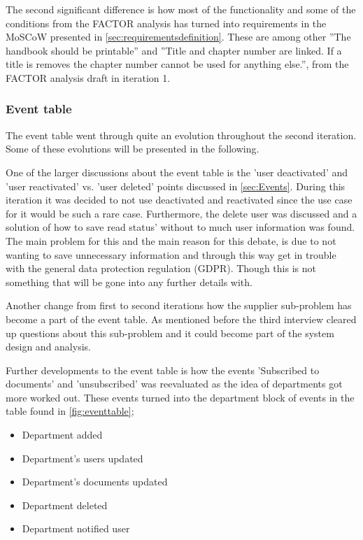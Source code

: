The second significant difference is how most of the functionality and some of the conditions from the FACTOR analysis has turned into requirements in the MoSCoW presented in \cref{sec:requirementsdefinition}. 
These are among other ''The handbook should be printable'' and ''Title and chapter number are linked. If a title is removes the chapter number cannot be used for anything else.'', from the FACTOR analysis draft in iteration 1.

\subsubsection*{Event table}
The event table went through quite an evolution throughout the second iteration.
Some of these evolutions will be presented in the following.

One of the larger discussions about the event table is the 'user deactivated' and 'user reactivated' vs. 'user deleted' points discussed in \cref{sec:Events}.
During this iteration it was decided to not use deactivated and reactivated since the use case for it would be such a rare case.
Furthermore, the delete user was discussed and a solution of how to save read status' without to much user information was found.
The main problem for this and the main reason for this debate, is due to not wanting to save unnecessary information and through this way get in trouble with the general data protection regulation (GDPR).
Though this is not something that will be gone into any further details with.

Another change from first to second iterations how the supplier sub-problem has become a part of the event table.
As mentioned before the third interview cleared up questions about this sub-problem and it could become part of the system design and analysis.

Further developments to the event table is how the events 'Subscribed to documents' and 'unsubscribed' was reevaluated as the idea of departments got more worked out.
These events turned into the department block of events in the table found in \cref{fig:eventtable};
\begin{itemize}
	\item 
	Department added
	\item
	Department's users updated
	\item
	Department's documents updated
	\item
	Department deleted
	\item
	Department notified user
\end{itemize} 

